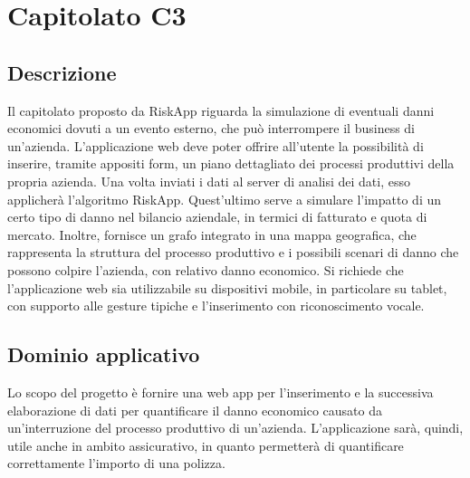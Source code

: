 \newpage
\section{Capitolato C3}

\subsection{Descrizione}

Il capitolato proposto da RiskApp riguarda la simulazione di eventuali danni economici dovuti a un evento esterno, che può interrompere il business di un'azienda. L’applicazione web deve poter offrire all’utente la possibilità di inserire, tramite appositi form, un piano dettagliato dei processi produttivi della propria azienda. Una volta inviati i dati al server di analisi dei dati, esso applicherà l'algoritmo RiskApp. Quest'ultimo serve a simulare l'impatto di un certo tipo di danno nel bilancio aziendale, in termici di fatturato e quota di mercato. Inoltre, fornisce un grafo integrato in una mappa geografica, che rappresenta la struttura del processo produttivo e i possibili scenari di danno che possono colpire l’azienda, con relativo danno economico. Si richiede che l'applicazione web sia utilizzabile su dispositivi mobile, in particolare su tablet, con supporto alle gesture tipiche e l'inserimento con riconoscimento vocale.

\subsection{Dominio applicativo}

Lo scopo del progetto è fornire una web app per l'inserimento e la successiva elaborazione di dati per quantificare il danno economico causato da un'interruzione del processo produttivo di un'azienda. L'applicazione sarà, quindi, utile anche in ambito assicurativo, in quanto permetterà di quantificare correttamente l'importo di una polizza.

